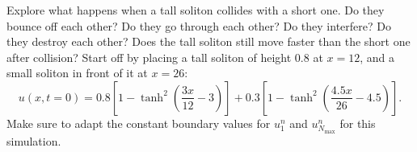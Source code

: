 \documentclass{../project}
\begin{document}
\begin{sheet}[title={Project 4: Partial differential equations (PDEs)}, number=4, due={December 20th, 10am}]
\begin{problem}[title={Solitons}, label=solitons]
  \begin{subproblem}[label=solitons:c,points=4]
    Explore what happens when a tall soliton collides with a short one.
    Do they bounce off each other? Do they go through each other?
    Do they interfere?
    Do they destroy each other?
    Does the tall soliton still move faster than the short one after collision?
    Start off by placing a tall soliton of height 0.8 at $x=12$,
    and a small soliton in front of it at $x=26$:
    \begin{equation}
      u(x,t=0) = 0.8 \left[ 1 - \tanh^2\left(\frac{3x}{12}-3\right)\right]
               + 0.3 \left[ 1 - \tanh^2\left(\frac{4.5x}{26}-4.5\right)\right].
    \end{equation}
    Make sure to adapt the constant boundary values for $u_1^n$ and $u_{N_\mathrm{max}}^n$
    for this simulation.
  \end{subproblem}

\end{problem}

\end{sheet}
\end{document}
